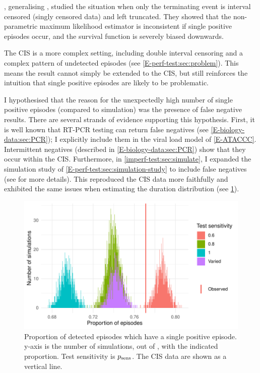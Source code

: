 \documentclass[thesis.tex]{subfiles}
\begin{document}
\Textcite{shenNonparametrica}, generalising \textcite{panNote}, studied the situation when only the terminating event is interval censored (\ie singly censored data) and left truncated.
They showed that the non-parametric maximum likelihood estimator is inconsistent if single positive episodes occur, and the survival function is severely biased downwards.

The CIS is a more complex setting, including double interval censoring and a complex pattern of undetected episodes (see \cref{E-perf-test:sec:problem}).
This means the result cannot simply be extended to the CIS, but still reinforces the intuition that single positive episodes are likely to be problematic.

I hypothesised that the reason for the unexpectedly high number of single positive episodes (compared to simulation) was the presence of false negative results.
There are several strands of evidence supporting this hypothesis.
First, it is well known that RT-PCR testing can return false negatives  (see \cref{E-biology-data:sec:PCR}); I explicitly include them in the viral load model of \cref{E-ATACCC}.
Intermittent negatives (described in  \cref{E-biology-data:sec:PCR}) show that they occur within the CIS.
Furthermore, in \cref{imperf-test:sec:simulate}, I expanded the simulation study of \cref{E-perf-test:sec:simulation-study} to include false negatives (see  for more details).
This reproduced the CIS data more faithfully and exhibited the same issues when estimating the duration distribution (see \cref{imperf-test:fig:sim-single-pos}).
\begin{figure}
  \centering \includegraphics{cis-imperfect-testing/sim-single-positive-episodes}
  \caption[Single positive episodes in CIS simulation]{%
    Proportion of detected episodes which have a single positive episode.
    y-axis is the number of simulations, out of , with the indicated proportion.
    Test sensitivity is $p_\text{sens}$.
    The CIS data are shown as a vertical line.
  }
  \label{imperf-test:fig:sim-single-pos}
\end{figure}
\end{document}
